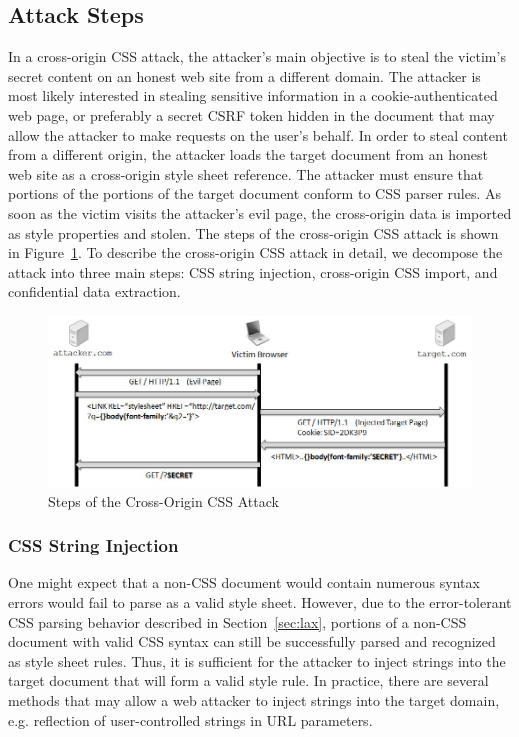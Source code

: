 \documentclass{acm_proc_article-sp}
\begin{document}
\subsection{Attack Steps}
In a cross-origin CSS attack, the attacker's main objective is to steal the victim's secret content on an honest web site from a different domain. The attacker is most likely interested in stealing sensitive information in a cookie-authenticated web page, or preferably a secret CSRF token hidden in the document that may allow the attacker to make requests on the user's behalf. In order to steal content from a different origin, the attacker loads the target document from an honest web site as a cross-origin style sheet reference. The attacker must ensure that portions of the portions of the target document conform to CSS parser rules. As soon as the victim visits the attacker's evil page, the cross-origin data is imported as style properties and stolen. The steps of the cross-origin CSS attack is shown in Figure~\ref{figure:steps}. To describe the cross-origin CSS attack in detail, we decompose the attack into three main steps: CSS string injection, cross-origin CSS import, and confidential data extraction.

\begin{figure}
\centering
\includegraphics[width=\linewidth]{steps.jpg}
\caption{Steps of the Cross-Origin CSS Attack}
\label{figure:steps}
\end{figure}

\subsubsection{CSS String Injection}
One might expect that a non-CSS document would contain numerous syntax errors would fail to parse as a valid style sheet. However, due to the error-tolerant CSS parsing behavior described in Section~\ref{sec:lax}, portions of a non-CSS document with valid CSS syntax can still be successfully parsed and recognized as style sheet rules. Thus, it is sufficient for the attacker to inject strings into the target document that will form a valid style rule. In practice, there are several methods that may allow a web attacker to inject strings into the target domain, e.g. reflection of user-controlled strings in URL parameters. 
\end{document}
